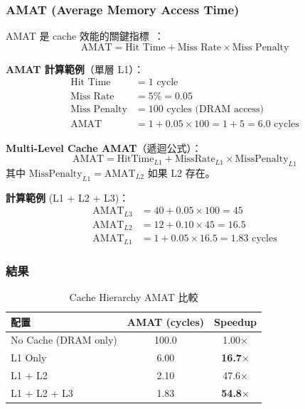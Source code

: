 \documentclass[journal]{IEEEtran}
\begin{document}
\subsubsection{AMAT (Average Memory Access Time)}
AMAT 是 cache 效能的關鍵指標~\cite{hennessy2017computer}：
\begin{equation}
\text{AMAT} = \text{Hit Time} + \text{Miss Rate} \times \text{Miss Penalty}
\end{equation}

\textbf{AMAT 計算範例}（單層 L1）：
\begin{align*}
\text{Hit Time} &= 1 \text{ cycle} \\
\text{Miss Rate} &= 5\% = 0.05 \\
\text{Miss Penalty} &= 100 \text{ cycles (DRAM access)} \\
\text{AMAT} &= 1 + 0.05 \times 100 = 1 + 5 = 6.0 \text{ cycles}
\end{align*}

\textbf{Multi-Level Cache AMAT}（遞迴公式）：
\begin{equation}
\text{AMAT} = \text{HitTime}_{L1} + \text{MissRate}_{L1} \times \text{MissPenalty}_{L1}
\end{equation}
其中 $\text{MissPenalty}_{L1} = \text{AMAT}_{L2}$ 如果 L2 存在。

\textbf{計算範例} (L1 + L2 + L3)：
\begin{align*}
\text{AMAT}_{L3} &= 40 + 0.05 \times 100 = 45 \\
\text{AMAT}_{L2} &= 12 + 0.10 \times 45 = 16.5 \\
\text{AMAT}_{L1} &= 1 + 0.05 \times 16.5 = 1.83 \text{ cycles}
\end{align*}

\subsubsection{結果}
\begin{table}[!t]
\centering
\caption{Cache Hierarchy AMAT 比較}
\label{tab:amat}
\footnotesize
\begin{tabular}{@{}lcc@{}}
\toprule
\textbf{配置} & \textbf{AMAT (cycles)} & \textbf{Speedup} \\
\midrule
No Cache (DRAM only) & 100.0 & 1.00$\times$ \\
L1 Only & 6.00 & \textbf{16.7$\times$} \\
L1 + L2 & 2.10 & 47.6$\times$ \\
L1 + L2 + L3 & 1.83 & \textbf{54.8$\times$} \\
\bottomrule
\end{tabular}
\end{table}
\end{document}
